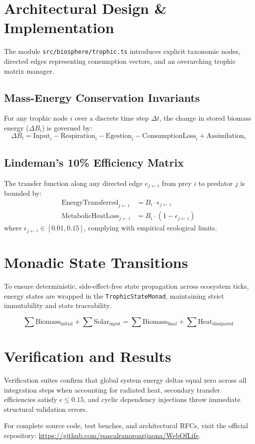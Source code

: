 \documentclass[11pt, a4paper]{article}
\begin{document}
\section{Architectural Design \& Implementation}
The module \texttt{src/biosphere/trophic.ts} introduces explicit taxonomic nodes, directed edges representing consumption vectors, and an overarching trophic matrix manager.

\subsection{Mass-Energy Conservation Invariants}
For any trophic node $i$ over a discrete time step $\Delta t$, the change in stored biomass energy ($\Delta B_i$) is governed by:
\begin{equation}
\Delta B_i = \text{Input}_i - \text{Respiration}_i - \text{Egestion}_i - \text{ConsumptionLoss}_i + \text{Assimilation}_i
\end{equation}

\subsection{Lindeman's 10\% Efficiency Matrix}
The transfer function along any directed edge $e_{j \leftarrow i}$ from prey $i$ to predator $j$ is bounded by:
\begin{align}
\text{EnergyTransferred}_{j \leftarrow i} &= B_i \cdot \epsilon_{j \leftarrow i} \\
\text{MetabolicHeatLoss}_{j \leftarrow i} &= B_i \cdot (1 - \epsilon_{j \leftarrow i})
\end{align}
where $\epsilon_{j \leftarrow i} \in [0.01, 0.15]$, complying with empirical ecological limits.

\section{Monadic State Transitions}
To ensure deterministic, side-effect-free state propagation across ecosystem ticks, energy states are wrapped in the \texttt{TrophicStateMonad}, maintaining strict immutability and state traceability.

\begin{equation}
\sum \text{Biomass}_{\text{initial}} + \sum \text{Solar}_{\text{input}} = \sum \text{Biomass}_{\text{final}} + \sum \text{Heat}_{\text{dissipated}}
\end{equation}

\section{Verification and Results}
Verification suites confirm that global system energy deltas equal zero across all integration steps when accounting for radiated heat, secondary transfer efficiencies satisfy $\epsilon \le 0.15$, and cyclic dependency injections throw immediate structural validation errors.

For complete source code, test benches, and architectural RFCs, visit the official repository: \url{https://github.com/pascalranoroarijaona/WebOfLife}.
\end{document}
